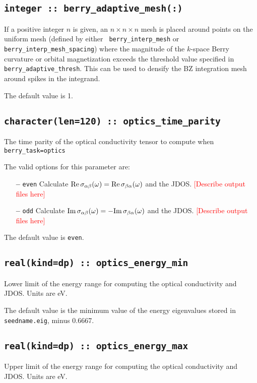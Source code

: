 \subsection[berry\_adaptive\_mesh]{\tt integer :: berry\_adaptive\_mesh(:)}

If a positive integer $n$ is given, an $n\times n\times n$ mesh is
placed around points on the uniform mesh (defined by either {\tt
  berry\_interp\_mesh} or {\tt berry\_interp\_mesh\_spacing}) where
the magnitude of the $k$-space Berry curvature or orbital
magnetization exceeds the threshold value specified in {\tt
  berry\_adaptive\_thresh}. This can be used to densify the BZ
integration mesh around spikes in the integrand.

The default value is 1.

\subsection[berry\_spectrum\_time\_parity]{\tt character(len=120) ::  optics\_time\_parity}
The time parity of the optical conductivity tensor to compute when
{\tt berry\_task=optics}

The valid options for this parameter are:
\begin{itemize}
\item[{\bf --}]  \verb#even# Calculate ${\rm Re}\,\sigma_{\alpha\beta}(\omega)={\rm Re}\,\sigma_{\beta\alpha}(\omega)$ and the JDOS. \textcolor{red}{[Describe output files here]}
\item[{\bf --}]  \verb#odd#  Calculate ${\rm Im}\,\sigma_{\alpha\beta}(\omega)=-{\rm Im}\,\sigma_{\beta\alpha}(\omega)$  and the JDOS. \textcolor{red}{[Describe output files here]}
\end{itemize}

The default value is {\tt even}.


\subsection[optics\_energy\_min]{\tt real(kind=dp) :: optics\_energy\_min}
Lower limit of the energy range for computing the optical conductivity
and JDOS.  Units are eV.

The default value is the minimum value of the energy eigenvalues
stored in {\tt seedname.eig}, minus 0.6667.

\subsection[optics\_energy\_max]{\tt real(kind=dp) :: optics\_energy\_max}
Upper limit of the energy range for computing the optical conductivity
and JDOS.  Units are eV.

